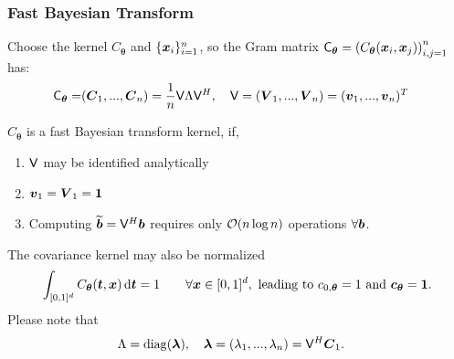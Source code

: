 \documentclass[handout, 10pt,compress,xcolor={usenames,dvipsnames}]{beamer} %
\newcommand{\bm}[1]{\boldsymbol{#1}}
\renewcommand{\mLambda}{\Lambda}
\newcommand{\vC}{\bvec{C}}
\newcommand{\mCtheta}{\mC_{\vtheta}}
\newcommand{\D}[1]{\text{d}{#1}}
\renewcommand{\vtheta}{{\bm{\theta}}}
\newcommand{\pause}{}
\begin{document}
\begin{frame}
\frametitle{Fast Bayesian Transform}
\vspace{-4ex}
Choose the kernel $C_{\vtheta}$ and $\{\boldsymbol{x}_i\}_{i=1}^n$, so the Gram matrix $\mCtheta =  \left( C_{\vtheta} (\vx_i,\vx_j) \right)_{i,j=1}^n$ has:
\vspace{-2ex}
\begin{align*}
\mCtheta =& (\vC_1,...,\vC_n)
=  \frac 1n \mV \mLambda \mV^H, \quad
\mV = (\vV_1,...,\vV_n) = (\vv_1,...,\vv_n)^T
\end{align*}
\pause 
\vspace{-2ex}
$C_{\vtheta}$ is a fast Bayesian transform kernel, if,
\begin{enumerate}
	\item $\mathsf{V}$ { may be identified analytically}
	\item $\boldsymbol{v}_1 = \boldsymbol{V}_1 = \boldsymbol{1}$
	\item \alert{Computing $\widetilde{\boldsymbol{b}} = \mathsf{V}^H \boldsymbol{b}$ requires only $\operatorname{{\mathcal O}}(n \log n)$ operations  $\forall \boldsymbol{b}$.}
\end{enumerate}
\vspace{-1.5ex}
The covariance kernel may also be normalized 
\begin{align*}
\int_{[0,1]^d} C_\vtheta(\vt,\vx) \, \D \vt = 1 \qquad \forall \vx \in [0,1]^d,
\text{ leading to $c_{0,\vtheta} = 1$ and $\vc_{\vtheta} = \vone$}.
\end{align*}
Please note that
\begin{align*}
\mLambda &= \diag (\vlambda), \quad \vlambda = (\lambda_1,...,\lambda_n) = \mV^H \vC_1.
\end{align*}

\end{frame}
\end{document}

